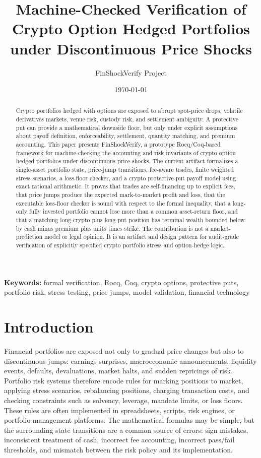 \documentclass[11pt]{article}
\title{Machine-Checked Verification of Crypto Option Hedged Portfolios under Discontinuous Price Shocks}
\author{FinShockVerify Project}
\date{\today}
\begin{document}
\maketitle

\begin{abstract}
Crypto portfolios hedged with options are exposed to abrupt spot-price drops,
volatile derivatives markets, venue risk, custody risk, and settlement
ambiguity. A protective put can provide a mathematical downside floor, but only
under explicit assumptions about payoff definition, enforceability, settlement,
quantity matching, and premium accounting. This paper presents FinShockVerify,
a prototype Rocq/Coq-based framework for machine-checking the accounting and
risk invariants of crypto option hedged portfolios under discontinuous price
shocks. The current artifact formalizes a single-asset portfolio state,
price-jump transitions, fee-aware trades, finite weighted stress scenarios, a
loss-floor checker, and a crypto protective-put payoff model using exact
rational arithmetic. It proves that trades are self-financing up to explicit
fees, that price jumps produce the expected mark-to-market profit and loss,
that the executable loss-floor checker is sound with respect to the formal
inequality, that a long-only fully invested portfolio cannot lose more than a
common asset-return floor, and that a matching long-crypto plus long-put
position has terminal wealth bounded below by cash minus premium plus units
times strike. The contribution is not a market-prediction model or legal
opinion. It is an artifact and design pattern for audit-grade verification of
explicitly specified crypto portfolio stress and option-hedge logic.
\end{abstract}

\noindent\textbf{Keywords:} formal verification, Rocq, Coq, crypto options,
protective puts, portfolio risk, stress testing, price jumps, model validation,
financial technology

\section{Introduction}

Financial portfolios are exposed not only to gradual price changes but also to
discontinuous jumps: earnings surprises, macroeconomic announcements, liquidity
events, defaults, devaluations, market halts, and sudden repricings of risk.
Portfolio risk systems therefore encode rules for marking positions to market,
applying stress scenarios, rebalancing positions, charging transaction costs,
and checking constraints such as solvency, leverage, mandate limits, or loss
floors. These rules are often implemented in spreadsheets, scripts, risk
engines, or portfolio-management platforms. The mathematical formulas may be
simple, but the surrounding state transitions are a common source of errors:
sign mistakes, inconsistent treatment of cash, incorrect fee accounting,
incorrect pass/fail thresholds, and mismatch between the risk policy and its
implementation.
\end{document}
